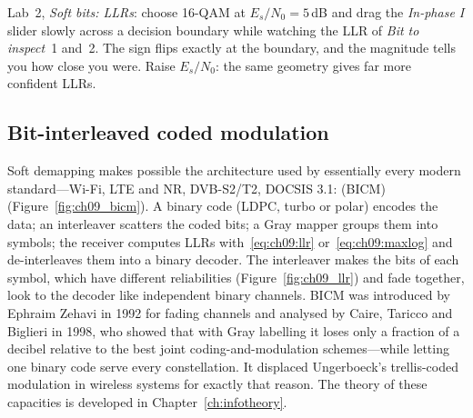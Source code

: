 \begin{tryit}
Lab~2, \emph{Soft bits: LLRs}: choose 16-QAM at $E_s/N_0=5$\,dB and drag the \emph{In-phase I}
slider slowly across a decision boundary while watching the LLR of \emph{Bit to inspect}~1 and~2.
The sign flips exactly at the boundary, and the magnitude tells you how close you were. Raise
$E_s/N_0$: the same geometry gives far more confident LLRs.
\end{tryit}

\subsection{Bit-interleaved coded modulation}

Soft demapping makes possible the architecture used by essentially every modern standard---Wi-Fi,
LTE and NR, DVB-S2/T2, DOCSIS 3.1:  (BICM)
(Figure~\ref{fig:ch09_bicm}). A binary code (LDPC, turbo or polar) encodes the data; an
interleaver scatters the coded bits; a Gray mapper groups them into symbols; the receiver computes
LLRs with~\eqref{eq:ch09:llr} or~\eqref{eq:ch09:maxlog} and de-interleaves them into a binary
decoder. The interleaver makes the bits of each symbol, which have different reliabilities
(Figure~\ref{fig:ch09_llr}) and fade together, look to the decoder like independent binary
channels. BICM was introduced by Ephraim Zehavi in 1992 for fading channels and analysed by Caire,
Taricco and Biglieri in 1998, who showed that with Gray labelling it loses only a fraction of a
decibel relative to the best joint coding-and-modulation schemes---while letting one binary code
serve every constellation. It displaced Ungerboeck's trellis-coded modulation in wireless systems
for exactly that reason. The theory of these capacities is developed in
Chapter~\ref{ch:infotheory}.

